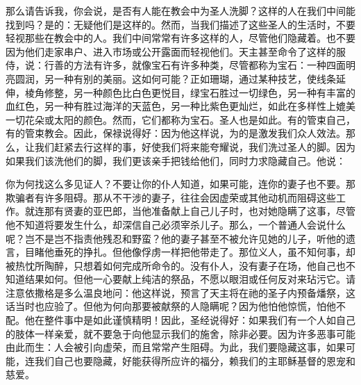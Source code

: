 那么请告诉我，你会说，是否有人能在教会中为圣人洗脚？这样的人在我们中间能找到吗？是的：无疑他们是这样的。然而，当我们描述了这些圣人的生活时，不要轻视那些在教会中的人。我们中间常常有许多这样的人，尽管他们隐藏着。也不要因为他们走家串户、进入市场或公开露面而轻视他们。天主甚至命令了这样的服侍，说：行善的方法有许多，就像宝石有许多种类，尽管都称为宝石：一种四面明亮圆润，另一种有别的美丽。这如何可能？正如珊瑚，通过某种技艺，使线条延伸，棱角修整，另一种颜色比白色更悦目，绿宝石胜过一切绿色，另一种有丰富的血红色，另一种有胜过海洋的天蓝色，另一种比紫色更灿烂，如此在多样性上媲美一切花朵或太阳的颜色。然而，它们都称为宝石。圣人也是如此。有的管束自己，有的管束教会。因此，保禄说得好：因为他这样说，为的是激发我们众人效法。那么，让我们赶紧去行这样的事，好使我们将来能夸耀说，我们洗过圣人的脚。因为如果我们该洗他们的脚，我们更该亲手把钱给他们，同时力求隐藏自己。他说：\par

你为何找这么多见证人？不要让你的仆人知道，如果可能，连你的妻子也不要。那欺骗者有许多阻碍。那从不干涉的妻子，往往会因虚荣或其他动机而阻碍这些工作。就连那有贤妻的亚巴郎，当他准备献上自己儿子时，也对她隐瞒了这事，尽管他不知道将要发生什么，却深信自己必须宰杀儿子。那么，一个普通人会说什么呢？岂不是岂不指责他残忍和野蛮？他的妻子甚至不被允许见她的儿子，听他的遗言，目睹他垂死的挣扎。但他像俘虏一样把他带走了。那位义人，虽不知何事，却被热忱所陶醉，只想着如何完成所命令的。没有仆人，没有妻子在场，他自己也不知道结果如何。但他一心要献上纯洁的祭品，不愿以眼泪或任何反对来玷污它。请注意依撒格是多么温良地问：他这样说，预言了天主将在祂的圣子内预备燔祭，这话当时也应验了。但他为何向那要被献祭的人隐瞒呢？因为他怕他惊慌，怕他不配。他在整件事中是如此谨慎精明！因此，圣经说得好：如果我们有一个人如自己的肢体一样亲爱，就不要急于向他显示我们的施舍，除非必要。因为许多恶事可能由此而生：人会被引向虚荣，而且常常产生阻碍。为此，我们要隐藏这事，如果可能，连我们自己也要隐藏，好能获得所应许的福分，赖我们的主耶稣基督的恩宠和慈爱。\par


